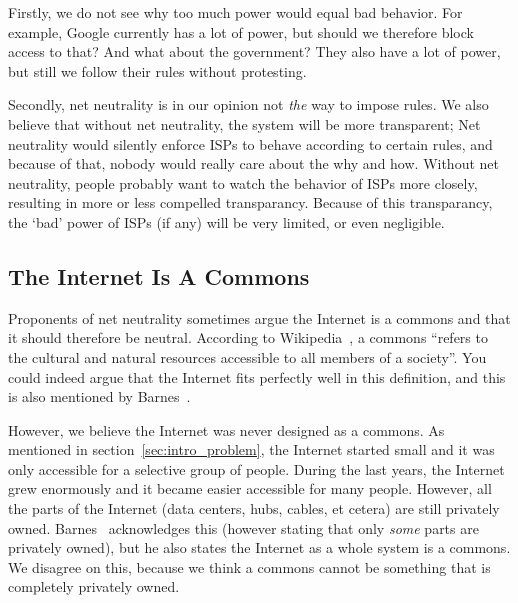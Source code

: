 Firstly, we do not see why too much power would equal bad behavior.
For example, Google currently has a lot of power, but should we therefore block access to that?
And what about the government?
They also have a lot of power, but still we follow their rules without protesting.

Secondly, net neutrality is in our opinion not \emph{the} way to impose rules.
We also believe that without net neutrality, the system will be more transparent;
Net neutrality would silently enforce \acp{ISP} to behave according to certain rules, and because of that, nobody would really care about the why and how.
Without net neutrality, people probably want to watch the behavior of \acp{ISP} more closely, resulting in more or less compelled transparancy.
Because of this transparancy, the `bad' power of \acp{ISP} (if any) will be very limited, or even negligible.

\subsection{The Internet Is A Commons}
Proponents of net neutrality sometimes argue the Internet is a commons and that it should therefore be neutral.
According to Wikipedia~\cite{wikipedia2014commons}, a commons ``refers to the cultural and natural resources accessible to all members of a society''.
You could indeed argue that the Internet fits perfectly well in this definition, and this is also mentioned by Barnes~\cite{barnes2003capitalism}.

However, we believe the Internet was never designed as a commons.
As mentioned in section~\ref{sec:intro_problem}, the Internet started small and it was only accessible for a selective group of people.
During the last years, the Internet grew enormously and it became easier accessible for many people.
However, all the parts of the Internet (data centers, hubs, cables, et cetera) are still privately owned.
Barnes~\cite{barnes2003capitalism} acknowledges this (however stating that only \emph{some} parts are privately owned), but he also states the Internet as a whole system is a commons.
We disagree on this, because we think a commons cannot be something that is completely privately owned.
